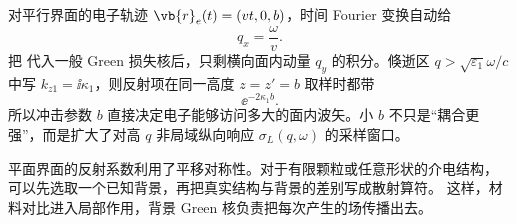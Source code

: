 对平行界面的电子轨迹 $\vb{r}_e(t)=(vt,0,b)$，时间 Fourier 变换自动给
\[
q_x=\frac{\omega}{v}.
\]
把 代入一般 Green 损失核后，只剩横向面内动量 $q_y$ 的积分。倏逝区 $q>\sqrt{\varepsilon_1}\omega/c$ 中写 $k_{z1}=\ii\kappa_1$，则反射项在同一高度 $z=z'=b$ 取样时都带
\begin{equation}
{\ee^{-2\kappa_1b}.}
\label{eq:2d_eels_evanscent_impact_parameter_factor}
\end{equation}
所以冲击参数 $b$ 直接决定电子能够访问多大的面内波矢。小 $b$ 不只是“耦合更强”，而是扩大了对高 $q$ 非局域纵向响应 $\sigma_L(q,\omega)$ 的采样窗口。

平面界面的反射系数利用了平移对称性。对于有限颗粒或任意形状的介电结构，
可以先选取一个已知背景，再把真实结构与背景的差别写成散射算符。
这样，材料对比进入局部作用，背景 Green 核负责把每次产生的场传播出去。


